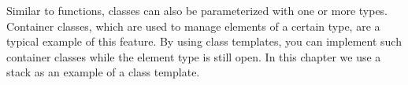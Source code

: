 Similar to functions, classes can also be parameterized with one or more types. Container classes, which are used to manage elements of a certain type, are a typical example of this feature. By using class templates, you can implement such container classes while the element type is still open. In this chapter we use a stack as an example of a class template.